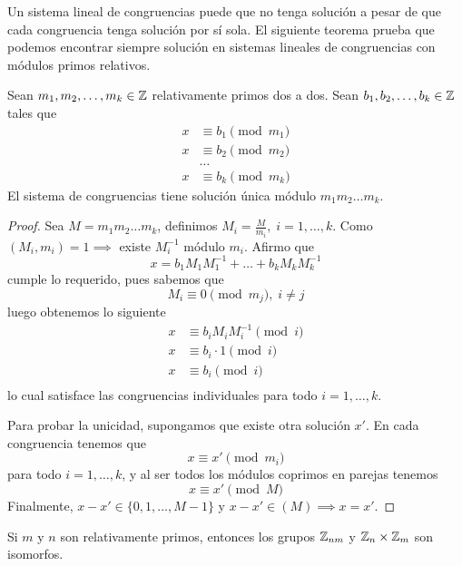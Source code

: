 \documentclass[main.tex]{subfiles}
\begin{document}
Un sistema lineal de congruencias puede que no tenga soluci\'on a pesar de que cada congruencia tenga soluci\'on por s\'i sola. El siguiente teorema prueba que podemos encontrar siempre soluci\'on en sistemas lineales de congruencias con m\'odulos primos relativos.

\begin{theorem}
    Sean $m_1, m_2, \dots, m_k \in \mathbb Z$ relativamente primos dos a dos. Sean $b_1, b_2, \dots, b_k \in \mathbb Z$ tales que
    \begin{align*}
        x &\equiv b_1 \pmod{m_1}\\
        x &\equiv b_2 \pmod{m_2}\\
        &\dots\\
        x &\equiv b_k \pmod{m_k}
    \end{align*}
    El sistema de congruencias tiene soluci\'on \'unica m\'odulo $m_1 m_2 \dots m_k$.
\end{theorem}

\begin{proof}
    Sea $M = m_1 m_2 \dots m_k$, definimos $M_i = \frac{M}{m_i},\;i = 1, \dots, k$. Como $(M_i, m_i) = 1 \implies$ existe $M_i^{-1}$ m\'odulo $m_i$.
    Afirmo que
    $$x = b_1 M_1 M_1^{-1} + \dots + b_k M_k M_k^{-1}$$
    cumple lo requerido, pues sabemos que
    $$M_i \equiv 0 \pmod{m_j},\; i \not= j$$
    luego obtenemos lo siguiente
    \begin{align*}
        x &\equiv b_i M_i M_i^{-1} \pmod{i}\\
        x &\equiv b_i \cdot 1 \pmod{i}\\
        x &\equiv b_i \pmod{i}\\
    \end{align*}
    lo cual satisface las congruencias individuales para todo $i = 1, \dots, k$.
    
    Para probar la unicidad, supongamos que existe otra soluci\'on $x'$. En cada congruencia tenemos que
    $$x \equiv x' \pmod{m_i}$$
    para todo $i = 1, \dots, k$, y al ser todos los m\'odulos coprimos en parejas tenemos
    $$x \equiv x' \pmod{M}$$
    Finalmente, $x - x' \in \{0, 1, \dots, M - 1\}$ y $x - x' \in (M) \implies x = x'$.
\end{proof}

\begin{proposition}
    Si $m$ y $n$ son relativamente primos, entonces los grupos $\mathbb Z_{nm}$ y $\mathbb Z_n \times \mathbb Z_m$ son isomorfos.
\end{proposition}
\end{document}
